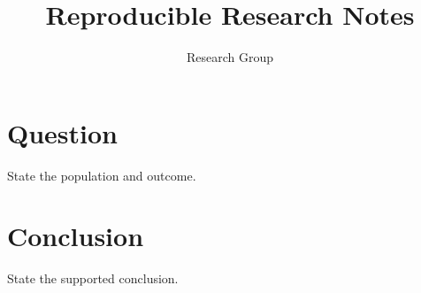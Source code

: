 \documentclass{article}
\begin{document}
\title{Reproducible Research Notes}\author{Research Group}\date{}\maketitle
\section{Question}State the population and outcome.

\section{Conclusion}State the supported conclusion.
\end{document}
